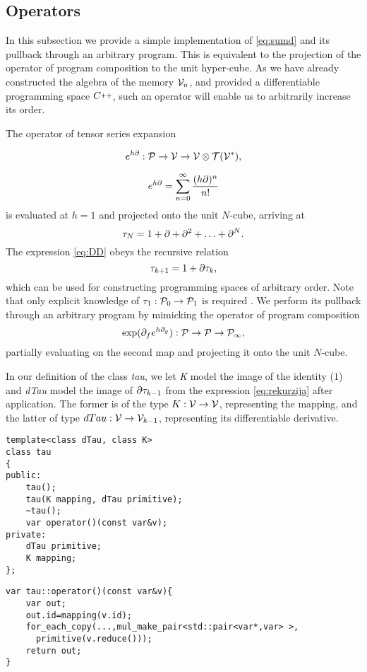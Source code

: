              
\subsection{Operators}\label{sec:operators}

In this subsection we provide a simple implementation of \eqref{eq:sumd} and its pullback through an arbitrary program. This is equivalent to the projection of the operator of program composition to the unit hyper-cube. As we have already constructed the algebra of the memory $\mathcal{V}_n$, and provided a differentiable programming space $\CC$, such an operator will enable us to arbitrarily increase its order.

The operator of tensor series expansion \cite[Theorem~5.1]{OperationalCalculus}

\begin{equation}\label{eq:specProg}
            e^{h\partial}:\mathcal{P}\to\mathcal{V}\to \mathcal{V}\otimes \mathcal{T}(\mathcal{V}^*),
          \end{equation}

\begin{equation}
  e^{h\partial}=\sum\limits_{n=0}^{\infty}\frac{(h\partial)^n}{n!}
 \end{equation}
 is evaluated at $h=1$ and projected onto the unit $N$-cube, arriving at 
\begin{equation}\label{eq:DD}
    \tau_N = 1+\partial +\partial^2 +\ldots + \partial^N.
  \end{equation}
The expression \eqref{eq:DD} obeys the recursive relation
\begin{equation}
      \label{eq:rekurzija}
      \tau_{k+1} = 1+\partial\tau_k,
    \end{equation}
which can be used for constructing programming spaces of arbitrary order. Note that only explicit knowledge of $\tau_1:\mathcal{P}_0\to\mathcal{P}_1$ is required \cite[Proposition~5.1]{OperationalCalculus}. We perform its pullback through an arbitrary program by mimicking the operator of program composition \cite[Theorem~5.2]{OperationalCalculus}
\begin{equation}\label{eq:opKompo}
  \exp(\partial_fe^{h\partial_g}): \mathcal{P}\to\mathcal{P}\to\mathcal{P}_\infty,
  \end{equation}
partially evaluating on the second map and projecting it onto the unit $N$-cube.         

In our definition of the class \emph{tau}, we let \emph{K} model the image of the identity ($1$) and \emph{dTau} model the image of $\partial\tau_{k-1}$ from the expression \eqref{eq:rekurzija} after application. The former is of the type $K:\mathcal{V}\to\mathcal{V}$, representing the mapping, and the latter of type $dTau:\mathcal{V}\to\mathcal{V}_{k-1}$, representing its differentiable derivative.  
\begin{lstlisting}
template<class dTau, class K>
class tau
{
public:
    tau();
    tau(K mapping, dTau primitive);
    ~tau();
    var operator()(const var&v);
private:
    dTau primitive;
    K mapping;
};
\end{lstlisting}        
        
\begin{lstlisting}
var tau::operator()(const var&v){
    var out;
    out.id=mapping(v.id);
    for_each_copy(...,mul_make_pair<std::pair<var*,var> >, 
      primitive(v.reduce()));
    return out;
}
\end{lstlisting}
